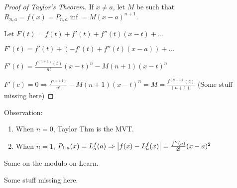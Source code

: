 
\begin{proof}[Proof of Taylor's Theorem]
    If $x \neq a$, let $M$ be such that $R_{n,a}=f(x)=P_{n,a}\inf = M(x-a)^{n+1}$.
    
    Let $F(t)= f(t) + f'(t) + f''(t)(x-t) + ...$

    $F'(t) = f'(t) + (-f'(t) + f''(t) (x-a)) +...$
    
    $F'(t) = \frac{f^{(n+1)}(t)}{n!}(x-t)^n - M(n+1)(x-t)^n$
    
    $F'(c) = 0 \Rightarrow \frac{f^{(n+1)}}{n!} -M(n+1)(x-t)^n= M = \frac{f^{(n+1)}(c)}{(n+1)!}$ (Some stuff missing here)
\end{proof}



Observation:
\begin{enumerate}
    \item When $n = 0$, Taylor Thm is the MVT.
    \item When $n = 1$, $P_{1,a}(x)= L_a^f(a) \Rightarrow \left| f(x)-L_a^f(x) \right| = \frac{f''(a)}{2!}(x-a)^2$
\end{enumerate} 

\begin{exmp}[$\sin x$]
Same on the modulo on Learn.
\end{exmp}


Some stuff missing here.